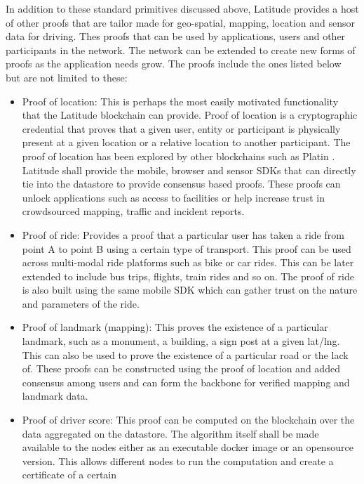 In addition to these standard primitives discussed above, Latitude provides a host of other proofs that are tailor made
for geo-spatial, mapping, location and sensor data for driving. Thes proofs that can be used by applications, users and
other participants in the network. The network can be extended to create new forms of proofs as the application needs
grow. The proofs include the ones listed below but are not limited to these:

 \begin{itemize}
     \item Proof of location: This is perhaps the most easily motivated functionality that the Latitude blockchain can
         provide. Proof of location is a cryptographic credential that proves that a given user, entity or participant
         is physically present at a given location or a relative location to another participant. The proof of location
         has been explored by other blockchains such as Platin \cite{platin}. Latitude shall provide the mobile, browser
         and sensor SDKs that can directly tie into the datastore to provide consensus based proofs. These proofs can
         unlock applications such as access to facilities or help increase trust in crowdsourced mapping, traffic and incident
         reports.
     \item Proof of ride: Provides a proof that a particular user has taken a ride from point A to point B using a
         certain type of transport. This proof can be used across multi-modal ride platforms such as bike or car rides.
         This can be later extended to include bus trips, flights, train rides and so on. The proof of ride is also
         built using the same mobile SDK which can gather trust on the nature and parameters of the ride.
     \item Proof of landmark (mapping): This proves the existence of a particular landmark, such as a monument, a
         building, a sign post at a given lat/lng. This can also be used to prove the existence of a particular road or
         the lack of. These proofs can be constructed using the proof of location and added consensus among users and
         can form the backbone for verified mapping and landmark data.
     \item Proof of driver score: This proof can be computed on the blockchain over the data aggregated on the
         datastore. The algorithm itself shall be made available to the nodes either as an executable docker image or an
         opensource version. This allows different nodes to run the computation and create a certificate of a certain

\end{itemize}
